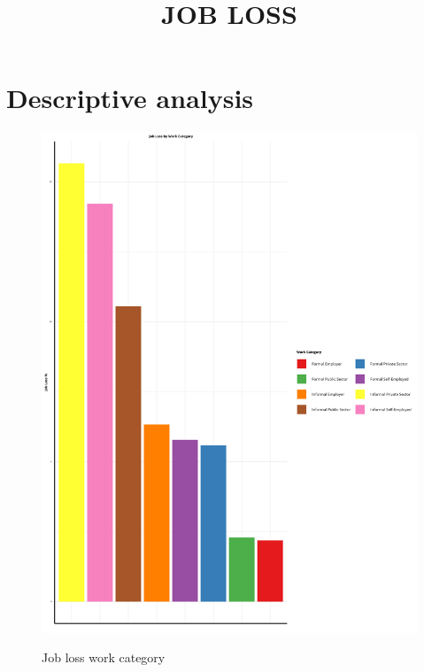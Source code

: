 \documentclass[a4paper]{article}
\date{\displaydate{date} }
\title{\LARGE JOB LOSS}
\begin{document}
\maketitle

\section{Descriptive analysis}\label{sec:desc_pam}



\begin{figure}[hb]
  \centering
  \caption{Job loss work category}
  \includegraphics[width=0.85\linewidth]{../analysis/output/graph/_graph_job_loss_work_category.png}
  \label{fig:_graph_job_loss_work_category}
\end{figure}
\end{document}
